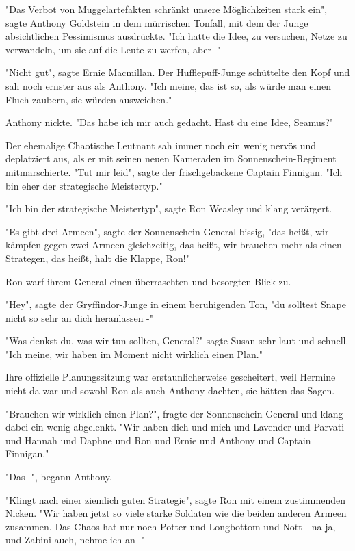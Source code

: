 {"Das Verbot von Muggelartefakten schränkt unsere Möglichkeiten stark ein", sagte Anthony Goldstein in dem mürrischen Tonfall, mit dem der Junge absichtlichen Pessimismus ausdrückte. "Ich hatte die Idee, zu versuchen, Netze zu verwandeln, um sie auf die Leute zu werfen, aber -"

"Nicht gut", sagte Ernie Macmillan. Der Hufflepuff-Junge schüttelte den Kopf und sah noch ernster aus als Anthony. "Ich meine, das ist so, als würde man einen Fluch zaubern, sie würden ausweichen."

Anthony nickte. "Das habe ich mir auch gedacht. Hast du eine Idee, Seamus?"

Der ehemalige Chaotische Leutnant sah immer noch ein wenig nervös und deplatziert aus, als er mit seinen neuen Kameraden im Sonnenschein-Regiment mitmarschierte. "Tut mir leid", sagte der frischgebackene Captain Finnigan. "Ich bin eher der strategische Meistertyp."

"Ich bin der strategische Meistertyp", sagte Ron Weasley und klang verärgert.

"Es gibt drei Armeen", sagte der Sonnenschein-General bissig, "das heißt, wir kämpfen gegen zwei Armeen gleichzeitig, das heißt, wir brauchen mehr als einen Strategen, das heißt, halt die Klappe, Ron!"

Ron warf ihrem General einen überraschten und besorgten Blick zu.

"Hey", sagte der Gryffindor-Junge in einem beruhigenden Ton, "du solltest Snape nicht so sehr an dich heranlassen -"

"Was denkst du, was wir tun sollten, General?" sagte Susan sehr laut und schnell. "Ich meine, wir haben im Moment nicht wirklich einen Plan."

Ihre offizielle Planungssitzung war erstaunlicherweise gescheitert, weil Hermine nicht da war und sowohl Ron als auch Anthony dachten, sie hätten das Sagen.

"Brauchen wir wirklich einen Plan?", fragte der Sonnenschein-General und klang dabei ein wenig abgelenkt. "Wir haben dich und mich und Lavender und Parvati und Hannah und Daphne und Ron und Ernie und Anthony und Captain Finnigan."

"Das -", begann Anthony.

"Klingt nach einer ziemlich guten Strategie", sagte Ron mit einem zustimmenden Nicken. "Wir haben jetzt so viele starke Soldaten wie die beiden anderen Armeen zusammen. Das Chaos hat nur noch Potter und Longbottom und Nott - na ja, und Zabini auch, nehme ich an -"

}
